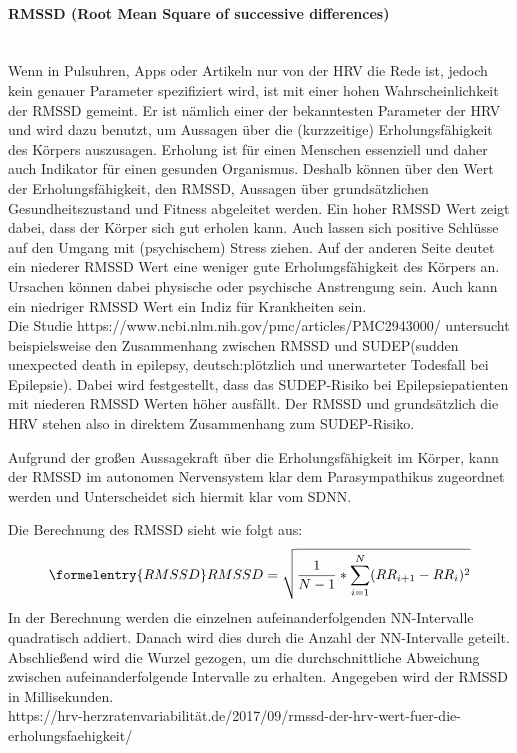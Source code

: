 \paragraph{RMSSD (Root Mean Square of successive differences)}\mbox{} \\
Wenn in Pulsuhren, Apps oder Artikeln nur von der HRV die Rede ist, jedoch kein genauer Parameter spezifiziert wird, ist mit einer hohen Wahrscheinlichkeit der RMSSD gemeint. Er ist nämlich einer der bekanntesten Parameter der HRV und wird dazu benutzt, um Aussagen über die (kurzzeitige) Erholungsfähigkeit des Körpers auszusagen. Erholung ist für einen Menschen essenziell und daher auch Indikator für einen gesunden Organismus. Deshalb können über den Wert der Erholungsfähigkeit, den RMSSD, Aussagen über grundsätzlichen Gesundheitszustand und Fitness abgeleitet werden.
Ein hoher RMSSD Wert zeigt dabei, dass der Körper sich gut erholen kann. Auch lassen sich positive Schlüsse auf den Umgang mit (psychischem) Stress ziehen. 
Auf der anderen Seite deutet ein niederer RMSSD Wert eine weniger gute Erholungsfähigkeit des Körpers an. Ursachen können dabei physische oder psychische Anstrengung sein. Auch kann ein niedriger RMSSD Wert ein Indiz für Krankheiten sein.\\
 Die Studie https://www.ncbi.nlm.nih.gov/pmc/articles/PMC2943000/ untersucht beispielsweise den Zusammenhang zwischen RMSSD und SUDEP(sudden unexpected death in epilepsy, deutsch:plötzlich und unerwarteter Todesfall bei Epilepsie). Dabei wird festgestellt, dass das SUDEP-Risiko bei Epilepsiepatienten mit niederen RMSSD Werten höher ausfällt. Der RMSSD und grundsätzlich die HRV stehen also in direktem Zusammenhang zum SUDEP-Risiko. 


Aufgrund der großen Aussagekraft über die Erholungsfähigkeit im Körper, kann der RMSSD im autonomen Nervensystem klar dem Parasympathikus zugeordnet werden und Unterscheidet sich hiermit klar vom SDNN. 

Die Berechnung des RMSSD sieht wie folgt aus:
\begin{equation}\formelentry{RMSSD}
	RMSSD = \sqrt{\dfrac{1}{N-1} * \sum\limits_{i=1}^{N}  (RR_{i+1} - RR_i)^{2}}
\end{equation}
In der Berechnung werden die einzelnen aufeinanderfolgenden NN-Intervalle quadratisch addiert. \color{red} Danach wird dies durch die Anzahl der NN-Intervalle geteilt.\color{black} Abschließend wird die Wurzel gezogen, um die durchschnittliche Abweichung zwischen aufeinanderfolgende Intervalle zu erhalten. Angegeben wird der RMSSD in Millisekunden.\\
https://hrv-herzratenvariabilität.de/2017/09/rmssd-der-hrv-wert-fuer-die-erholungsfaehigkeit/

